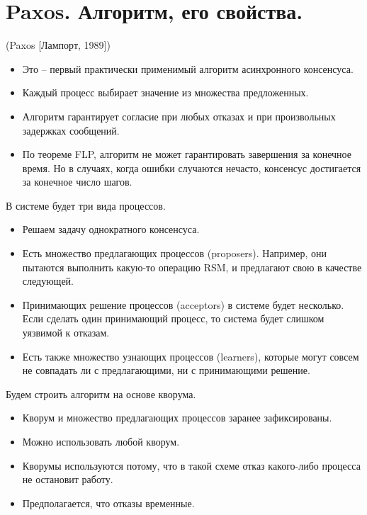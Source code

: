 \section{Paxos. Алгоритм, его свойства.}

\begin{algorithm}(Paxos [Лампорт, 1989])
    
    \begin{itemize}
        \item Это -- первый практически применимый алгоритм асинхронного
            консенсуса.
        \item Каждый процесс выбирает значение из множества предложенных.
        \item Алгоритм гарантирует согласие при любых отказах и при произвольных
            задержках сообщений.
        \item По теореме FLP, алгоритм не может гарантировать завершения за
            конечное время. Но в случаях, когда ошибки случаются нечасто,
            консенсус достигается за конечное число шагов.
    \end{itemize}
    В системе будет три вида процессов.
    \begin{itemize}
        \item Решаем задачу однократного консенсуса.
        \item Есть множество предлагающих процессов (proposers). Например, они 
            пытаются выполнить какую-то операцию RSM, и предлагают
            свою в качестве следующей.
        \item Принимающих решение процессов (acceptors) в системе будет несколько. Если
            сделать один принимающий процесс, то система будет слишком
            уязвимой к отказам.
        \item Есть также множество узнающих процессов (learners), которые могут 
            совсем не совпадать ли с предлагающими, ни с принимающими решение.
    \end{itemize}
    Будем строить алгоритм на основе кворума.
    \begin{itemize}
        \item Кворум и множество предлагающих процессов заранее зафиксированы.
        \item Можно использовать любой кворум.
        \item Кворумы используются потому, что в такой схеме отказ какого-либо
            процесса не остановит работу.
        \item Предполагается, что отказы временные.

\end{itemize}
\end{algorithm}
